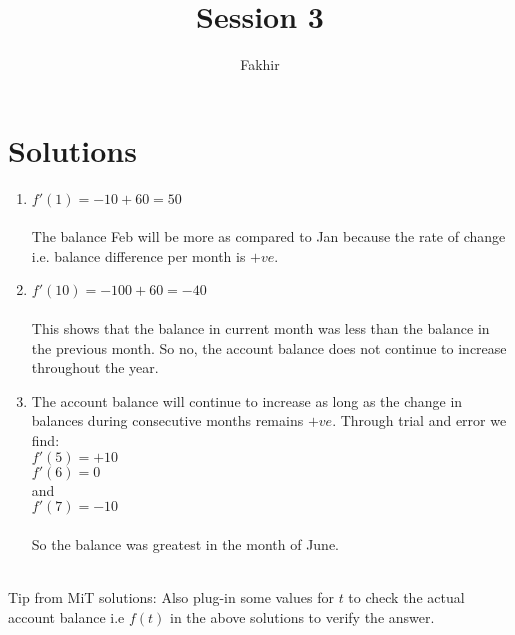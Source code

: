 \documentclass[]{article}
\title{Session 3}
\author{Fakhir}
\begin{document}
\maketitle

\section*{Solutions}

\begin{enumerate}
	\item $f'(1) = -10+60 = 50$ \\~\\
	The balance Feb will be more as compared to Jan because the rate of change i.e. balance difference per month is $+ve$.
	\item $f'(10) = -100+60 = -40$ \\~\\
	This shows that the balance in current month was less than the balance in the previous month. So no, the account balance does not continue to increase throughout the year.
	\item The account balance will continue to increase as long as the change in balances during consecutive months remains $+ve$. Through trial and error we find: \\
	$f'(5) = +10$ \\
	$f'(6) = 0$ \\
	and \\
	$f'(7) = -10$ \\~\\
	So the balance was greatest in the month of June. \\~\\
	
\end{enumerate}

Tip from MiT solutions: Also plug-in some values for $t$ to check the actual account balance i.e $f(t)$ in the above solutions to verify the answer.
\end{document}
